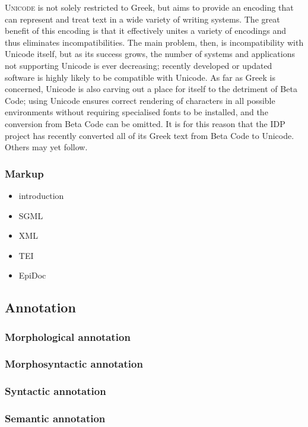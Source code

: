  \textsc{Unicode} is not solely restricted to Greek, but
aims to provide an encoding that can represent and treat text in a wide variety
of writing systems. The great benefit of this encoding is that it effectively
unites a variety of encodings and thus eliminates incompatibilities. The main
problem, then, is incompatibility with Unicode itself, but as its success
grows, the number of systems and applications not supporting Unicode is ever
decreasing; recently developed or updated software is highly likely to be
compatible with Unicode. As far as Greek is concerned, Unicode is also carving
out a place for itself to the detriment of Beta Code; using Unicode ensures
correct rendering of characters in all possible environments without requiring
specialised fonts to be installed, and the conversion from Beta Code can be
omitted. It is for this reason that the IDP project has recently converted all
of its Greek text from Beta Code to Unicode. Others may yet follow.


\subsubsection{Markup}
\label{subsect:markup}
\begin{itemize}
\item introduction
\item SGML
\item XML
\item TEI
\item EpiDoc
\end{itemize}
\subsection{Annotation}
\label{subsect:annotation}
\subsubsection{Morphological annotation}
\subsubsection{Morphosyntactic annotation}
\subsubsection{Syntactic annotation}
\subsubsection{Semantic annotation}
